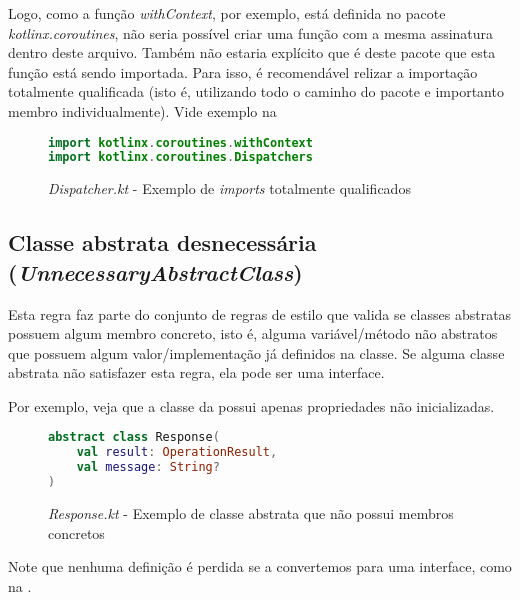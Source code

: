 Logo, como a função \textit{withContext}, por exemplo, está definida no pacote \textit{kotlinx.coroutines}, não seria possível criar uma função com a mesma assinatura dentro deste arquivo. Também não estaria explícito que é deste pacote que esta função está sendo importada. Para isso, é recomendável relizar a importação totalmente qualificada (isto é, utilizando todo o caminho do pacote e importanto membro individualmente). Vide exemplo na 

\begin{figure}[H]
    \centering
    \begin{lstlisting}[language=Kotlin]
import kotlinx.coroutines.withContext
import kotlinx.coroutines.Dispatchers
    \end{lstlisting}
    \caption{\textit{Dispatcher.kt} - Exemplo de \textit{imports} totalmente qualificados}
    \label{fig:detekt_wildcard_imports_after_example}
\end{figure}

\subsection{Classe abstrata desnecessária (\textit{UnnecessaryAbstractClass})}

Esta regra faz parte do conjunto de regras de estilo que valida se classes abstratas possuem algum membro concreto, isto é, alguma variável/método não abstratos que possuem algum valor/implementação já definidos na classe. Se alguma classe abstrata não satisfazer esta regra, ela pode ser uma interface.

Por exemplo, veja que a classe da  possui apenas propriedades não inicializadas.

\begin{figure}[H]
    \centering
    \begin{lstlisting}[language=Kotlin]
abstract class Response(
    val result: OperationResult,
    val message: String?
)
    \end{lstlisting}
    \caption{\textit{Response.kt} - Exemplo de classe abstrata que não possui membros concretos}
    \label{fig:detekt_unnecessary_abstract_class_before_example}
\end{figure}

Note que nenhuma definição é perdida se a convertemos para uma interface, como na .

